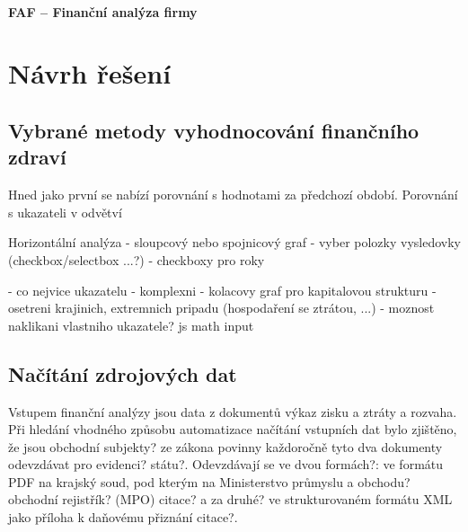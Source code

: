 \subsubsection{FAF -- Finanční analýza firmy}








































\chapter{Návrh řešení}
\section{Vybrané metody vyhodnocování finančního zdraví}

Hned jako první se nabízí porovnání s hodnotami za předchozí období. 
Porovnání s ukazateli v odvětví

Horizontální analýza
- sloupcový nebo spojnicový graf
- vyber polozky vysledovky (checkbox/selectbox ...?)
- checkboxy pro roky

- co nejvice ukazatelu - komplexni
- kolacovy graf pro kapitalovou strukturu
- osetreni krajinich, extremnich pripadu (hospodaření se ztrátou, ...)
- moznost naklikani vlastniho ukazatele? js math input


\section{Načítání zdrojových dat}
Vstupem finanční analýzy jsou data z dokumentů výkaz zisku a ztráty a rozvaha. Při hledání vhodného způsobu automatizace načítání vstupních dat bylo zjištěno, že jsou obchodní subjekty? ze zákona povinny každoročně tyto dva dokumenty odevzdávat pro evidenci? státu?. Odevzdávají se ve dvou formách?: ve formátu PDF na krajský soud, pod kterým na Ministerstvo průmyslu a obchodu? obchodní rejistřík? (MPO) citace? a za druhé? ve strukturovaném formátu XML jako příloha k daňovému přiznání citace?.

